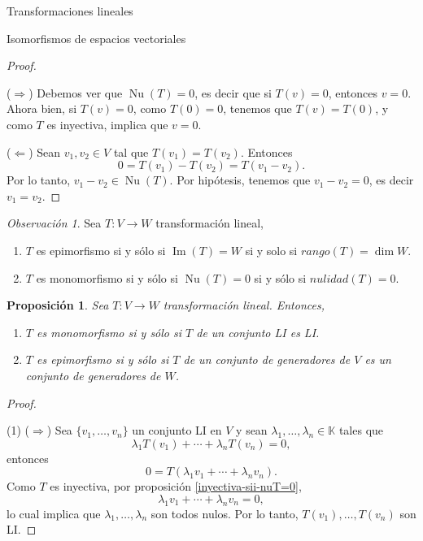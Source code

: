 \documentclass[a4paper,12pt,twoside,spanish,reqno]{amsbook}
\newtheorem{proposicion}[teorema]{Proposici\'on}
\theoremstyle{definition}
\theoremstyle{remark}
\newtheorem{obs}{Observaci\'on}[section]
\newcommand{\img}{\operatorname{Im}}
\newcommand{\nuc}{\operatorname{Nu}}
\newcommand{\K}{\mathbb K}
\begin{document}
\begin{chapter}{Transformaciones lineales}
\begin{section}{Isomorfismos de espacios vectoriales}
\begin{proof}
            \
            
            ($\Rightarrow$) Debemos ver que  $\nuc(T)=0$,  es decir que si $T(v)=0$,  entonces  $v=0$. Ahora bien,  si $T(v) = 0$, como  $T(0)=0$, tenemos que $T(v)  = T(0)$, y como $T$ es inyectiva, implica que $v =0$.
            
            ($\Leftarrow$) Sean  $v_1,v_2 \in V$ tal que $T(v_1)=T(v_2)$. Entonces 
            $$
            0 = T(v_1)- T(v_2) = T(v_1 -v_2).
            $$
            Por  lo tanto, $v_1 -v_2 \in \nuc(T)$. Por hipótesis, tenemos que $v_1 -v_2 =0$,  es decir $v_1 = v_2$.
        \end{proof}
        
        
        \begin{obs} Sea $T: V \to W$ transformación lineal, 
            \begin{enumerate}
                \item $T$  es {epimorfismo} si y sólo  si $\img(T) = W$ si  y solo si $rango(T) = \dim W$.
                \item $T$ es {monomorfismo} si y sólo  si $\nuc(T) = 0$ si y sólo si $nulidad(T) =0$.
            \end{enumerate}  
        \end{obs}		
        
        \begin{proposicion}\label{prop-T-mono-sii-li-2-li} Sea $T:V \to W$ transformación lineal. Entonces,
            \begin{enumerate}
                \item $T$ es monomorfismo si y sólo si $T$ de un conjunto LI  es  LI.
                \item $T$ es epimorfismo si y sólo si $T$ de un conjunto de generadores de $V$ es un conjunto de generadores de $W$.
            \end{enumerate}
        \end{proposicion}
        \begin{proof}
            
            \
            
            
            (1) ($\Rightarrow$) Sea $\{v_1,\ldots,v_n \}$ un conjunto LI en $V$ y sean  $\lambda_1,\ldots,\lambda_n \in \K$ tales que
            $$
            \lambda_1T(v_1) +\cdots+ \lambda_{n}T(v_n) =0,
            $$
            entonces
            $$
            0 = T(\lambda_1v_1+\cdots + \lambda_{n}v_n).
            $$
            Como $T$  es inyectiva, por proposición \ref{inyectiva-sii-nuT=0}, 
            $$
            \lambda_1v_1+\cdots + \lambda_{n}v_n =0,
            $$
            lo cual implica que $\lambda_1,\ldots,\lambda_n$ son todos nulos. Por lo tanto,  $T(v_1),\ldots,T(v_n)$ son LI.
            

\end{proof}
\end{section}
\end{chapter}
\end{document}
